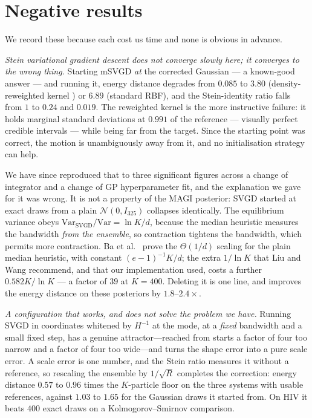 \documentclass[11pt]{article}
\theoremstyle{plain}
\theoremstyle{definition}
\theoremstyle{remark}
\begin{document}
\section{Negative results}

We record these because each cost us time and none is obvious in advance.

\emph{Stein variational gradient descent does not converge slowly here; it converges to the wrong
thing.} Starting mSVGD \emph{at} the corrected Gaussian --- a known-good answer --- and running it,
energy distance degrades from $0.085$ to $3.80$ (density-reweighted kernel \cite{huang2023}) or
$6.89$ (standard RBF), and the Stein-identity ratio falls from $1$ to $0.24$ and $0.019$. The
reweighted kernel is the more instructive failure: it holds marginal standard deviations at
$0.991$ of the reference --- visually perfect credible intervals --- while being far from the target.
Since the starting point was correct, the motion is unambiguously away from it, and no
initialisation strategy can help.

We have since reproduced that to three significant figures across a change of integrator and a
change of GP hyperparameter fit, and the explanation we gave for it was wrong. It is not a property
of the MAGI posterior: SVGD started at exact draws from a plain $\mathcal N(0, I_{325})$ collapses
identically. The equilibrium variance obeys $\mathrm{Var}_{\mathrm{SVGD}}/\mathrm{Var} = \ln K/d$,
because the median heuristic measures the bandwidth \emph{from the ensemble}, so contraction
tightens the bandwidth, which permits more contraction. Ba et al.\ \cite{ba2022} prove the
$\Theta(1/d)$ scaling for the plain median heuristic, with constant $(e-1)^{-1}K/d$; the extra
$1/\ln K$ that Liu and Wang recommend, and that our implementation used, costs a further
$0.582K/\ln K$ --- a factor of $39$ at $K = 400$. Deleting it is one line, and improves the energy
distance on these posteriors by $1.8$--$2.4\times$.

\emph{A configuration that works, and does not solve the problem we have.} Running SVGD in
coordinates whitened by $H^{-1}$ at the mode, at a \emph{fixed} bandwidth and a small fixed step,
has a genuine attractor---reached from starts a factor of four too narrow and a factor of four too
wide---and turns the shape error into a pure scale error. A scale error is one number, and the
Stein ratio measures it without a reference, so rescaling the ensemble by $1/\sqrt{R}$ completes
the correction: energy distance $0.57$ to $0.96$ times the $K$-particle floor on the three systems
with usable references, against $1.03$ to $1.65$ for the Gaussian draws it started from. On HIV it
beats $400$ exact draws on a Kolmogorov--Smirnov comparison.
\end{document}

